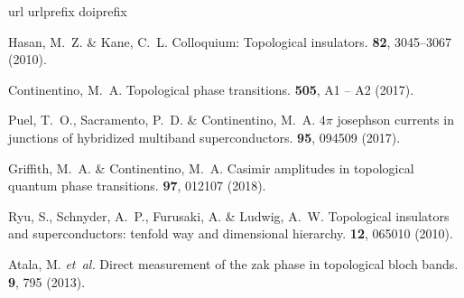 \documentclass[fleqn,10pt]{wlscirep}
\begin{document}
\begin{thebibliography}{10}
\expandafter\ifx\csname url\endcsname\relax
  \def\url#1{\texttt{#1}}\fi
\expandafter\ifx\csname urlprefix\endcsname\relax\def\urlprefix{URL }\fi
\expandafter\ifx\csname doiprefix\endcsname\relax\def\doiprefix{DOI: }\fi
\providecommand{\bibinfo}[2]{#2}
\providecommand{\eprint}[2][]{\url{#2}}

\bibinfo{author}{Hasan, M.~Z.} \& \bibinfo{author}{Kane, C.~L.}
\newblock \bibinfo{journal}{\bibinfo{title}{Colloquium: Topological
  insulators}}.
  \textbf{\bibinfo{volume}{82}}, \bibinfo{pages}{3045--3067}
  (\bibinfo{year}{2010}).

\bibinfo{author}{Continentino, M.~A.}
\newblock \bibinfo{journal}{\bibinfo{title}{Topological phase transitions}}.
  \textbf{\bibinfo{volume}{505}}, \bibinfo{pages}{A1 -- A2}
  (\bibinfo{year}{2017}).

\bibinfo{author}{Puel, T.~O.}, \bibinfo{author}{Sacramento, P.~D.} \&
  \bibinfo{author}{Continentino, M.~A.}
\newblock \bibinfo{journal}{\bibinfo{title}{$4\ensuremath{\pi}$ josephson
  currents in junctions of hybridized multiband superconductors}}.
 \textbf{\bibinfo{volume}{95}},
  \bibinfo{pages}{094509} (\bibinfo{year}{2017}).

\bibinfo{author}{Griffith, M.~A.} \& \bibinfo{author}{Continentino, M.~A.}
\newblock \bibinfo{journal}{\bibinfo{title}{Casimir amplitudes in topological
  quantum phase transitions}}.
 \textbf{\bibinfo{volume}{97}},
  \bibinfo{pages}{012107} (\bibinfo{year}{2018}).

\bibinfo{author}{Ryu, S.}, \bibinfo{author}{Schnyder, A.~P.},
  \bibinfo{author}{Furusaki, A.} \& \bibinfo{author}{Ludwig, A.~W.}
\newblock \bibinfo{journal}{\bibinfo{title}{Topological insulators and
  superconductors: tenfold way and dimensional hierarchy}}.
  \textbf{\bibinfo{volume}{12}}, \bibinfo{pages}{065010}
  (\bibinfo{year}{2010}).

\bibinfo{author}{Atala, M.} \emph{et~al.}
\newblock \bibinfo{journal}{\bibinfo{title}{Direct measurement of the zak phase
  in topological bloch bands}}.
 \textbf{\bibinfo{volume}{9}},
  \bibinfo{pages}{795} (\bibinfo{year}{2013}).


\end{thebibliography}
\end{document}
